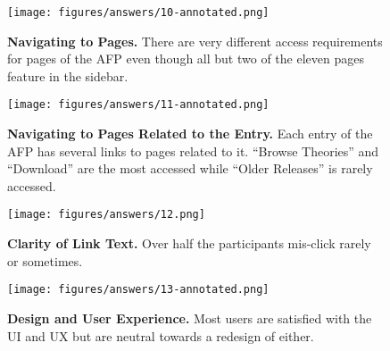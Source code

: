 \documentclass[bsc,frontabs,oneside,singlespacing,parskip,deptreport,logo]{infthesis}
\begin{document}
\begin{figure}[t]
    \centering
    \texttt{[image: figures/answers/10-annotated.png]}
    \caption{\textbf{Navigating to Pages.}
    There are very different access requirements for pages of the AFP even though all but two of the eleven pages feature in the sidebar.}
    \label{fig:navigating-to-pages}
\end{figure}



\begin{figure}[h]
    \centering
    \texttt{[image: figures/answers/11-annotated.png]}
    \caption{\textbf{Navigating to Pages Related to the Entry.}
    Each entry of the AFP has several links to pages related to it. ``Browse Theories'' and ``Download'' are the most accessed while ``Older Releases'' is rarely accessed.}
\end{figure}



\begin{figure}[h]
    \centering
    \texttt{[image: figures/answers/12.png]}
    \caption{\textbf{Clarity of Link Text.}
    Over half the participants mis-click rarely or sometimes.}
    \label{fig:clarity-of-link-text}
\end{figure}

\begin{figure}[h]
    \centering
    \texttt{[image: figures/answers/13-annotated.png]}
    \caption{\textbf{Design and User Experience.}
    Most users are satisfied with the UI and UX but are neutral towards a redesign of either.}
\end{figure}

\end{document}
